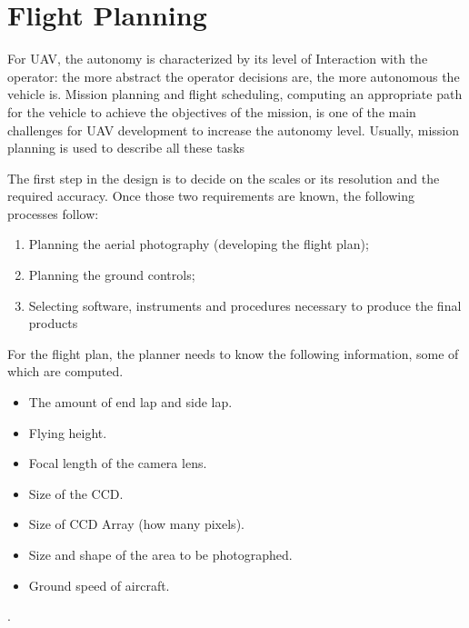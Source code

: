 \section{Flight Planning}
For UAV, the autonomy is characterized by its level of
Interaction with the operator: the more abstract the operator decisions are, the more autonomous the vehicle is. Mission planning and flight scheduling, computing an appropriate path for the vehicle to achieve the objectives of the mission, is one of the main challenges for UAV development to increase the autonomy level. Usually, mission planning is used to describe all these tasks\cite{4281723}

The first step in the design is to decide on the scales or its resolution and the required accuracy. Once those two requirements are known, the following processes follow:
\begin{enumerate}
\item Planning the aerial photography (developing the flight plan);
\item Planning the ground controls;
\item Selecting software, instruments and procedures necessary to produce the final products
\end{enumerate}
For the flight plan, the planner needs to know the following information, some of which are computed.\cite{Design_plann}
\begin{itemize}
\item The amount of end lap and side lap.
\item Flying height.
\item Focal length of the camera lens.
\item Size of the CCD.
\item Size of CCD Array (how many pixels).
\item Size and shape of the area to be photographed.
\item Ground speed of aircraft.
\end{itemize}.

